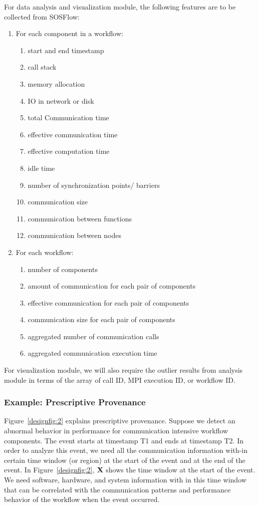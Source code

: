  For data analysis and visualization module, the following features are to be collected from SOSFlow:
\begin{enumerate}
\item {For each component in a workflow:}
\begin{enumerate}
\item start and end timestamp
\item call stack
\item memory allocation
\item IO in network or disk
\item total Communication time
\item effective  communication time
\item effective computation time
\item idle time
\item number of synchronization points/ barriers
\item communication size
\item communication between functions
\item communication between nodes
\end{enumerate}
\item  For each workflow:
\begin{enumerate}
\item number of components
\item amount of communication for each pair of components
\item effective communication for each pair of components
\item communication size for each pair of components
\item aggregated number of communication calls 
\item aggregated communication execution time
\end{enumerate}
\end{enumerate}

For visualization module, we will also require the outlier results from analysis module in terms of the array of call ID, MPI execution ID, or workflow ID.  

\subsubsection{Example: Prescriptive Provenance}
Figure~\ref{designfig:2}  explains prescriptive provenance. Suppose we detect an abnormal behavior in performance for communication intensive workflow components. The event starts at timestamp T1 and ends at timestamp T2. In order to analyze this event, we need all the communication information with-in certain time window (or region) at the start of the event and at the end of the event. In Figure~\ref{designfig:2}, ${\bf{X}}$ shows the time window at the start of the event. We need software, hardware, and system information with in this time window that can be correlated with the communication patterns and performance behavior of the workflow when the event occurred.

